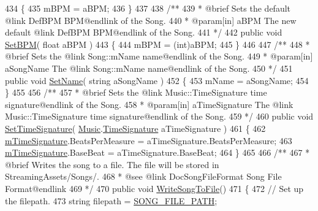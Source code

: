 \begin{DoxyCodeInclude}
434     \{
435         mBPM = aBPM;
436     \}
437 \textcolor{comment}{}
438 \textcolor{comment}{    /**}
439 \textcolor{comment}{     * @brief Sets the default @link DefBPM BPM@endlink of the Song.}
440 \textcolor{comment}{     * @param[in] aBPM The new default @link DefBPM BPM@endlink of the Song.}
441 \textcolor{comment}{    */}
442     \textcolor{keyword}{public} \textcolor{keywordtype}{void} \hyperlink{group___song_pub_func_gaa65bbba1af7192edff7e0f848029013b}{SetBPM}( \textcolor{keywordtype}{float} aBPM )
443     \{
444         mBPM = (int)aBPM;
445     \}
446 \textcolor{comment}{}
447 \textcolor{comment}{    /** }
448 \textcolor{comment}{     * @brief Sets the @link Song::mName name@endlink of the Song.}
449 \textcolor{comment}{     * @param[in] aSongName The @link Song::mName name@endlink of the Song.}
450 \textcolor{comment}{    */}
451     \textcolor{keyword}{public} \textcolor{keywordtype}{void} \hyperlink{group___song_pub_func_gacb01510cf72657fc7c64bb6ba00c2c56}{SetName}( \textcolor{keywordtype}{string} aSongName )
452     \{
453         mName = aSongName;
454     \}
455 \textcolor{comment}{}
456 \textcolor{comment}{    /**}
457 \textcolor{comment}{     * @brief Sets the @link Music::TimeSignature time signature@endlink of the Song.}
458 \textcolor{comment}{     * @param[in] aTimeSignature The @link Music::TimeSignature time signature@endlink of the Song.}
459 \textcolor{comment}{    */}
460     \textcolor{keyword}{public} \textcolor{keywordtype}{void} \hyperlink{group___song_pub_func_gaf9f2c7e6f4400f6f9854e68e70a49470}{SetTimeSignature}( \hyperlink{class_music}{Music}.\hyperlink{group___music_structs_struct_music_1_1_time_signature}{TimeSignature} aTimeSignature )
461     \{
462         \hyperlink{group___song_priv_var_ga2b2dcc0e83e49f7303b6a1371877b25e}{mTimeSignature}.BeatsPerMeasure = aTimeSignature.BeatsPerMeasure;
463         \hyperlink{group___song_priv_var_ga2b2dcc0e83e49f7303b6a1371877b25e}{mTimeSignature}.BaseBeat = aTimeSignature.BaseBeat;
464     \}
465 \textcolor{comment}{}
466 \textcolor{comment}{    /** }
467 \textcolor{comment}{     * @brief Writes the song to a file. The file will be stored in StreamingAssets/Songs/.}
468 \textcolor{comment}{     * @see @link DocSongFileFormat Song File Format@endlink}
469 \textcolor{comment}{    */}
470     \textcolor{keyword}{public} \textcolor{keywordtype}{void} \hyperlink{group___song_pub_func_ga70b0f6021c3b0590c561a88e3d1e5c2f}{WriteSongToFile}()
471     \{
472         \textcolor{comment}{// Set up the filepath.}
473         \textcolor{keywordtype}{string} filepath = \hyperlink{group___song_const_ga95247572cf734f9e8b35973de4eeb1a4}{SONG\_FILE\_PATH};

\end{DoxyCodeInclude}
